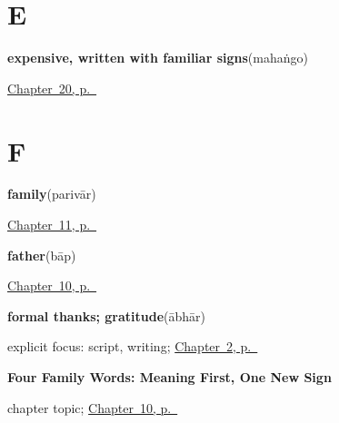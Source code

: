 \section*{E}

\noindent\begin{minipage}[t]{\linewidth}
\raggedright
\textbf{expensive, written with familiar signs}\enspace\emph{}\enspace(mahaṅgo)\par
\footnotesize \hyperref[ch:mw-shopping-seven]{Chapter~20, p.~\pageref*{ch:mw-shopping-seven}}
\end{minipage}\par\smallskip

\section*{F}

\noindent\begin{minipage}[t]{\linewidth}
\raggedright
\textbf{family}\enspace\emph{}\enspace(parivār)\par
\footnotesize \hyperref[ch:mw-family-seven]{Chapter~11, p.~\pageref*{ch:mw-family-seven}}
\end{minipage}\par\smallskip

\noindent\begin{minipage}[t]{\linewidth}
\raggedright
\textbf{father}\enspace\emph{}\enspace(bāp)\par
\footnotesize \hyperref[ch:mw-family-four]{Chapter~10, p.~\pageref*{ch:mw-family-four}}
\end{minipage}\par\smallskip

\noindent\begin{minipage}[t]{\linewidth}
\raggedright
\textbf{formal thanks; gratitude}\enspace\emph{}\enspace(ābhār)\par
\footnotesize explicit focus: script, writing; \hyperref[ch:mw-aabhaar]{Chapter~2, p.~\pageref*{ch:mw-aabhaar}}
\end{minipage}\par\smallskip

\noindent\begin{minipage}[t]{\linewidth}
\raggedright
\textbf{Four Family Words: Meaning First, One New Sign}\par
\footnotesize chapter topic; \hyperref[ch:mw-family-four]{Chapter~10, p.~\pageref*{ch:mw-family-four}}
\end{minipage}\par\smallskip

